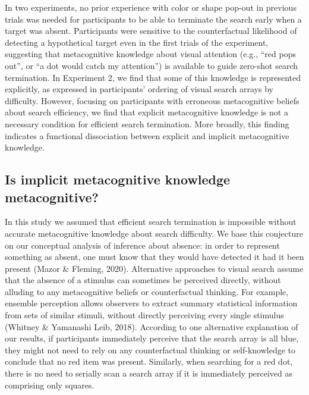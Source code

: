 \documentclass[
  english,
  man]{apa6}
\begin{document}
In two experiments, no prior experience with color or shape pop-out in previous trials was needed for participants to be able to terminate the search early when a target was absent. Participants were sensitive to the counterfactual likelihood of detecting a hypothetical target even in the first trials of the experiment, suggesting that metacognitive knowledge about visual attention (e.g., \enquote{red pops out}, or \enquote{a dot would catch my attention}) is available to guide zero-shot search termination. In Experiment 2, we find that some of this knowledge is represented explicitly, as expressed in participants' ordering of visual search arrays by difficulty. However, focusing on participants with erroneous metacognitive beliefs about search efficiency, we find that explicit metacognitive knowledge is not a necessary condition for efficient search termination. More broadly, this finding indicates a functional dissociation between explicit and implicit metacognitive knowledge.

\hypertarget{is-implicit-metacognitive-knowledge-metacognitive}{%
\subsection{Is implicit metacognitive knowledge metacognitive?}\label{is-implicit-metacognitive-knowledge-metacognitive}}

In this study we assumed that efficient search termination is impossible without accurate metacognitive knowledge about search difficulty. We base this conjecture on our conceptual analysis of inference about absence: in order to represent something as absent, one must know that they would have detected it had it been present (Mazor \& Fleming, 2020). Alternative approaches to visual search assume that the absence of a stimulus can sometimes be perceived directly, without alluding to any metacognitive beliefs or counterfactual thinking. For example, ensemble perception allows observers to extract summary statistical information from sets of similar stimuli, without directly perceiving every single stimulus (Whitney \& Yamanashi Leib, 2018). According to one alternative explanation of our results, if participants immediately perceive that the search array is all blue, they might not need to rely on any counterfactual thinking or self-knowledge to conclude that no red item was present. Similarly, when searching for a red dot, there is no need to serially scan a search array if it is immediately perceived as comprising only squares.
\end{document}
